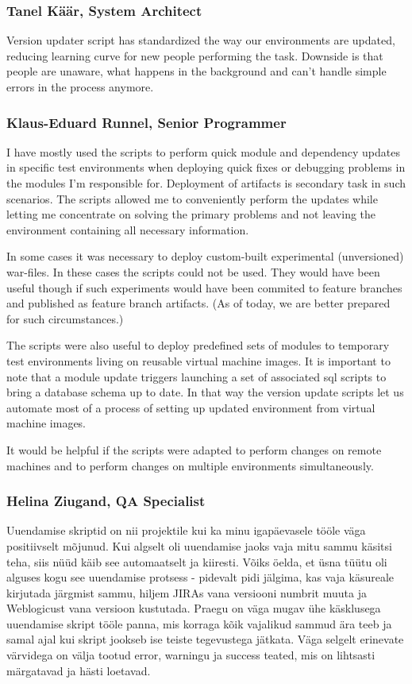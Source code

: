 \documentclass[12pt]{report}
\begin{document}
  \subsubsection{Tanel Käär, System Architect}
  
  Version updater script has standardized the way our environments are updated, reducing learning curve for new people performing the task. Downside is that people are unaware, what happens in the background and can't handle simple errors in the process anymore.
  
  \subsubsection{Klaus-Eduard Runnel, Senior Programmer}
  
  I have mostly used the scripts to perform quick module and dependency updates in specific test environments when deploying quick fixes or debugging problems in the modules I'm responsible for. Deployment of artifacts is secondary task in such scenarios. The scripts allowed me to conveniently perform the updates while letting me concentrate on solving the primary problems and not leaving the environment containing all necessary information.

In some cases it was necessary to deploy custom-built experimental (unversioned) war-files. In these cases the scripts could not be used.
They would have been useful though if such experiments would have been commited to feature branches and published as feature branch artifacts. (As of today, we are better prepared for such circumstances.)

The scripts were also useful to deploy predefined sets of modules to temporary test environments living on reusable virtual machine images. It is important to note that a module update triggers launching a set of associated sql scripts to bring a database schema up to date. In that way the version update scripts let us automate most of a process of setting up updated environment from virtual machine images.

It would be helpful if the scripts were adapted to perform changes on remote machines and to perform changes on multiple environments simultaneously.

  \subsubsection{Helina Ziugand, QA Specialist}
  
  Uuendamise skriptid on nii projektile kui ka minu igapäevasele tööle väga positiivselt mõjunud. 
Kui algselt oli uuendamise jaoks vaja mitu sammu käsitsi teha, siis nüüd käib see automaatselt ja kiiresti. Võiks öelda, et üsna tüütu oli alguses kogu see uuendamise protsess - pidevalt pidi jälgima, kas vaja käsureale kirjutada järgmist sammu, hiljem JIRAs vana versiooni numbrit muuta ja Weblogicust vana versioon kustutada. Praegu on väga mugav ühe käsklusega uuendamise skript tööle panna, mis korraga kõik vajalikud sammud ära teeb ja samal ajal kui skript jookseb ise teiste tegevustega jätkata. Väga selgelt erinevate värvidega on välja tootud error, warningu ja success teated, mis on lihtsasti märgatavad ja hästi loetavad. 
\end{document}
